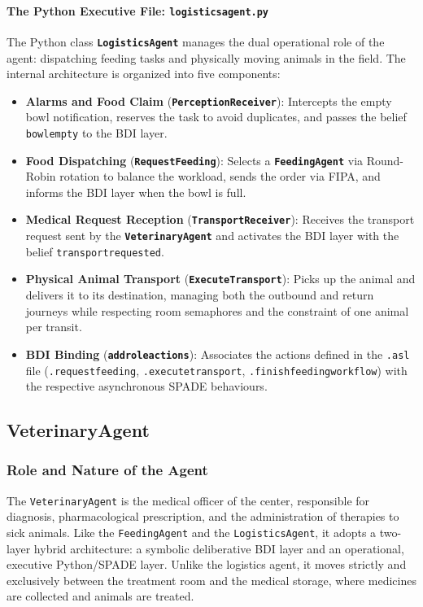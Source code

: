 \documentclass{article}
\renewcommand{\_}{\oldtextunderscore\allowbreak}
\begin{document}
\paragraph{The Python Executive File: \texttt{logistics\_agent.py}}
The Python class \textbf{\texttt{LogisticsAgent}} manages the dual operational role of the agent: dispatching feeding tasks and physically moving animals in the field.
The internal architecture is organized into five components:
\begin{itemize}
    \item \textbf{Alarms and Food Claim} (\textbf{\texttt{PerceptionReceiver}}): Intercepts the empty bowl notification, reserves the task to avoid duplicates, and passes the belief \texttt{bowl\_empty} to the BDI layer.
    \item \textbf{Food Dispatching} (\textbf{\texttt{RequestFeeding}}): Selects a \textbf{\texttt{FeedingAgent}} via Round-Robin rotation to balance the workload, sends the order via FIPA, and informs the BDI layer when the bowl is full.
    \item \textbf{Medical Request Reception} (\textbf{\texttt{TransportReceiver}}): Receives the transport request sent by the \textbf{\texttt{VeterinaryAgent}} and activates the BDI layer with the belief \texttt{transport\_requested}.
    \item \textbf{Physical Animal Transport} (\textbf{\texttt{ExecuteTransport}}): Picks up the animal and delivers it to its destination, managing both the outbound and return journeys while respecting room semaphores and the constraint of one animal per transit.
    \item \textbf{BDI Binding} (\textbf{\texttt{add\_role\_actions}}): Associates the actions defined in the \texttt{.asl} file (\texttt{.request\_feeding}, \texttt{.execute\_transport}, \texttt{.finish\_feeding\_workflow}) with the respective asynchronous SPADE behaviours.
\end{itemize}



\subsection{VeterinaryAgent}
\subsubsection{Role and Nature of the Agent}
The \texttt{VeterinaryAgent} is the medical officer of the center, responsible for diagnosis, pharmacological prescription, and the administration of therapies to sick animals.
Like the \texttt{FeedingAgent} and the \texttt{LogisticsAgent}, it adopts a two-layer hybrid architecture: a symbolic deliberative BDI layer and an operational, executive Python/SPADE layer. Unlike the logistics agent, it moves strictly and exclusively between the treatment room and the medical storage, where medicines are collected and animals are treated.
\end{document}
